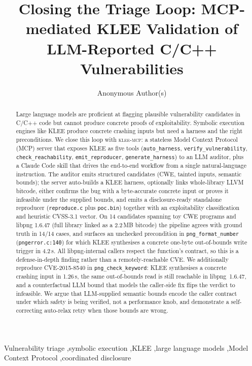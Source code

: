 \documentclass[3p,times,procedia]{elsarticle}
\begin{document}
\begin{frontmatter}


\title{Closing the Triage Loop: MCP-mediated KLEE Validation of LLM-Reported C/C++ Vulnerabilities}

\author[a]{Anonymous Author(s)}

\address[a]{Affiliation withheld for double-blind review}

\begin{abstract}
Large language models are proficient at flagging plausible vulnerability candidates in C/C++ code but cannot produce concrete proofs of exploitability. Symbolic execution engines like KLEE produce concrete crashing inputs but need a harness and the right preconditions. We close this loop with \textsc{klee-mcp}: a stateless Model Context Protocol (MCP) server that exposes KLEE as five tools (\texttt{auto\_harness}, \texttt{verify\_vulnerability}, \texttt{check\_reachability}, \texttt{emit\_reproducer}, \texttt{generate\_harness}) to an LLM auditor, plus a Claude Code skill that drives the end-to-end workflow from a single natural-language instruction. The auditor emits structured candidates (CWE, tainted inputs, semantic bounds); the server auto-builds a KLEE harness, optionally links whole-library LLVM bitcode, either confirms the bug with a byte-accurate concrete input or proves it infeasible under the supplied bounds, and emits a disclosure-ready standalone reproducer (\texttt{reproduce.c} plus \texttt{poc.bin}) together with an exploitability classification and heuristic CVSS-3.1 vector. On 14 candidates spanning toy CWE programs and libpng 1.6.47 (full library linked as a 2.2\,MB bitcode) the pipeline agrees with ground truth in 14/14 cases, and surfaces an unchecked precondition in \texttt{png\_format\_number} (\texttt{pngerror.c:140}) for which KLEE synthesises a concrete one-byte out-of-bounds write trigger in 4.2\,s. All libpng-internal callers respect the function's contract, so this is a defense-in-depth finding rather than a remotely-reachable CVE. We additionally reproduce CVE-2015-8540 in \texttt{png\_check\_keyword}: KLEE synthesises a concrete crashing input in 1.26\,s, the same out-of-bounds read is still reachable in libpng~1.6.47, and a counterfactual LLM bound that models the caller-side fix flips the verdict to infeasible. We argue that LLM-supplied semantic bounds encode the caller contract under which safety is being verified, not a performance knob, and demonstrate a self-correcting auto-relax retry when those bounds are wrong.
\end{abstract}

\begin{keyword}
Vulnerability triage \sep symbolic execution \sep KLEE \sep large language models \sep Model Context Protocol \sep coordinated disclosure
\end{keyword}
\end{frontmatter}
\end{document}
